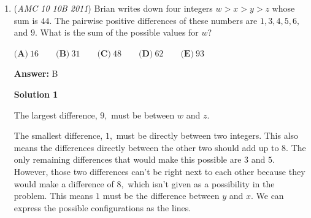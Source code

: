 \begin{enumerate}
 We find the total area of rhombus $ABCD$, which we can again split into two congruent equilateral triangles with side length $2$. Using the formula of equilateral triangles and then multiplying by $\dfrac{1}{3}$:
 \[\dfrac{\sqrt{3}}{4}\cdot 2^2 \cdot 2 \cdot \dfrac{1}{3} = 2\sqrt{3} \cdot \dfrac{1}{3} = \boxed{\textbf{(C)}~\dfrac{2\sqrt{3}}{3}}\]-NSAoPS, diagram modified from Solution 1.

 \textbf{Note} There is an intuitive explanation for why the shaded region is one third of the rhombus. Consider one of the equilateral triangles; the figure is symmetrical, so one half of the shaded region should be in the triangle. Note that the perpendicular bisectors we constructed in previous solutions to deliminate $R$ must be medians, as the triangle is equilateral. Therefore, recalling that the three intersecting medians of a triangle divide it into 6 smaller triangles of equal area, we observe that the shaded region in the equilateral triangles includes precisely two of these smaller triangles. We can repeat this with the other equilateral triangle that forms the rhombus, and thus we conclude that the shaded area is one third of the rhombus's total area. 

 


	\item (\textit{AMC 10 10B 2011}) Brian writes down four integers $w > x > y > z$ whose sum is $44$. The pairwise positive differences of these numbers are $1, 3, 4, 5, 6,$ and $9$. What is the sum of the possible values for $w$?


 $\textbf{(A)}\ 16 \qquad\textbf{(B)}\ 31 \qquad\textbf{(C)}\ 48 \qquad\textbf{(D)}\ 62 \qquad\textbf{(E)}\ 93$

 \textbf{Answer: }B



\textbf{Solution 1}

The largest difference, $9,$ must be between $w$ and $z.$

 The smallest difference, $1,$ must be directly between two integers. This also means the differences directly between the other two should add up to $8.$ The only remaining differences that would make this possible are $3$ and $5.$ However, those two differences can't be right next to each other because they would make a difference of $8,$ which isn't given as a possibility in the problem. This means $1$ must be the difference between $y$ and $x.$ We can express the possible configurations as the lines.

 



\end{enumerate}
